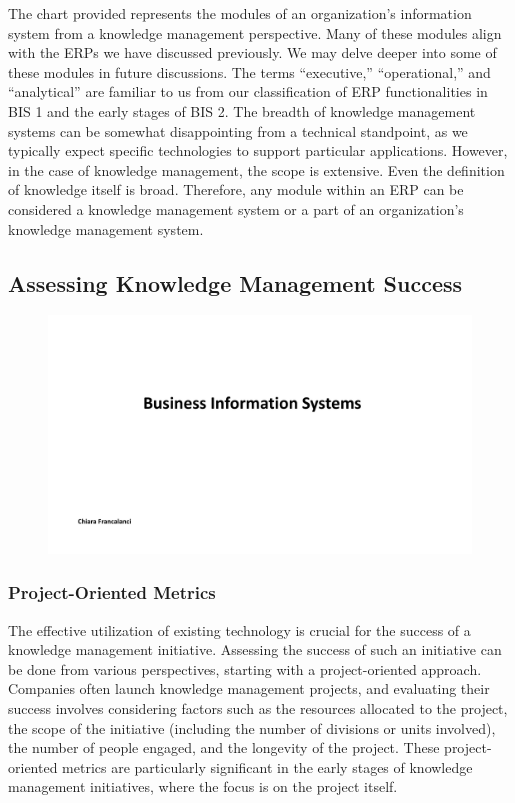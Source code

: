 The chart provided represents the modules of an organization's
information system from a knowledge management perspective. Many of
these modules align with the ERPs we have discussed previously. We may
delve deeper into some of these modules in future discussions. The terms
``executive,'' ``operational,'' and ``analytical'' are familiar to us
from our classification of ERP functionalities in BIS 1 and the early
stages of BIS 2. The breadth of knowledge management systems can be
somewhat disappointing from a technical standpoint, as we typically
expect specific technologies to support particular applications.
However, in the case of knowledge management, the scope is extensive.
Even the definition of knowledge itself is broad. Therefore, any module
within an ERP can be considered a knowledge management system or a part
of an organization's knowledge management system.

\subsection{Assessing Knowledge Management
    Success}\label{assessing-knowledge-management-success}

\begin{figure}[!h]
    \centering
    \includegraphics[page=17, trim = 1.5cm 4cm 3cm 4cm, clip, width=\textwidth]{images/05 - KM.pdf}
\end{figure}

\subsubsection{Project-Oriented Metrics}\label{project-oriented-metrics}

The effective utilization of existing technology is crucial for the
success of a knowledge management initiative. Assessing the success of
such an initiative can be done from various perspectives, starting with
a project-oriented approach. Companies often launch knowledge management
projects, and evaluating their success involves considering factors such
as the resources allocated to the project, the scope of the initiative
(including the number of divisions or units involved), the number of
people engaged, and the longevity of the project. These project-oriented
metrics are particularly significant in the early stages of knowledge
management initiatives, where the focus is on the project itself.

